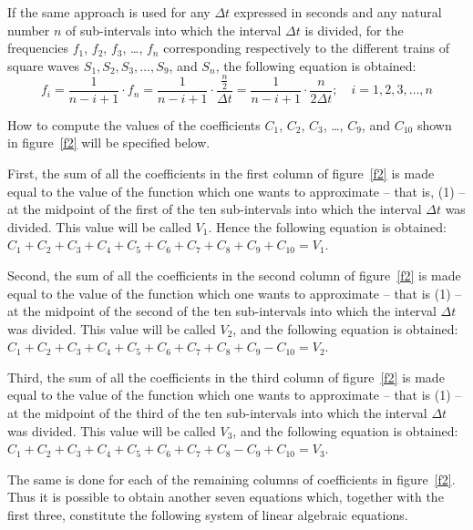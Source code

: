 \documentclass[11pt]{rMTA2010} \usepackage[utf8]{inputenc} \usepackage{graphicx} \usepackage{booktabs} \usepackage{array} \usepackage{enumerate}
\begin{document}
If the same approach is used for any $\Delta t$ expressed in seconds and any natural number $n$ of sub-intervals into which
the interval $\Delta t$ is divided, for the frequencies $f_1$, $f_2$, $f_3$, \ldots, $f_{n}$ corresponding respectively to the different trains of square waves $S_1, S_2, S_3, \dots, S_9$, and $S_{n}$, the following equation is obtained:
\begin{equation*}
f_i = \frac{1}{n-i+1}\cdot f_{n} = \frac{1}{n-i+1}\cdot \frac{\tfrac{n}{2}}{\Delta t} =  \frac{1}{n-i+1}\cdot \frac{n}{2\Delta t} ;\quad i = 1, 2, 3, \dots, n
\end{equation*}

How to compute the values of the coefficients $C_1$, $C_2$, $C_3$, \ldots, $C_9$, and $C_{10}$ shown in figure~\ref{f2} will be specified below.

First, the sum of all the coefficients in the first column of figure~\ref{f2} is made equal to the value of the function which one wants to approximate -- that is, (1) -- at the midpoint of the first of the ten sub-intervals into which the interval $\Delta t$ was divided. This value will be called $V_1$. Hence the following equation is obtained:
$C_1 + C_2 + C_3 + C_4 + C_5 + C_6 + C_7 + C_8 + C_9 + C_{10} = V_1$.

Second, the sum of all the coefficients in the second column of figure~\ref{f2} is made equal to the value of the function which one wants to approximate -- that is (1) -- at the midpoint of the second of the ten sub-intervals into which the interval  $\Delta t$ was divided. This value will be called $V_2$, and the following equation is obtained:
$C_1 + C_2 + C_3 + C_4 + C_5 + C_6 + C_7 + C_8 + C_9 - C_{10} = V_2$.

Third, the sum of all the coefficients in the third column of figure~\ref{f2} is made equal to the value of the function which one wants to approximate -- that is (1) -- at the midpoint of the third of the ten sub-intervals into which the interval $\Delta t$ was divided. This value will be called $V_3$, and the following equation is obtained:
$C_1 + C_2 + C_3 + C_4 + C_5 + C_6 + C_7 + C_8 - C_9 + C_{10} = V_3$.

The same is done for each of the remaining columns of coefficients in figure~\ref{f2}. Thus it is possible to obtain another seven equations which, together with the first three, constitute the following system of linear algebraic equations.
\end{document}

